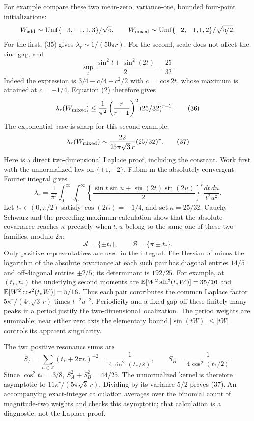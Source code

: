 For example compare these two mean-zero, variance-one, bounded four-point
initializations:
\[
 W_{\rm odd}\sim\operatorname{Unif}\{-3,-1,1,3\}/\sqrt5,
 \qquad
 W_{\rm mixed}\sim\operatorname{Unif}\{-2,-1,1,2\}/\sqrt{5/2}.
\]
For the first, (35) gives $\lambda_r\sim1/(50\pi r)$.
For the second, scale does not affect the sine gap, and
\[
 \sup_t\frac{\sin^2t+\sin^2(2t)}2=\frac{25}{32}.
\]
Indeed the expression is $3/4-c/4-c^2/2$ with $c=\cos2t$, whose
maximum is attained at $c=-1/4$. Equation (2) therefore gives
\[
 \lambda_r(W_{\rm mixed})\le\frac1{\pi^2}
       \left(\frac r{r-1}\right)^2(25/32)^{r-1}.       \tag{36}
\]
The exponential base is sharp for this second example:
\[
 \lambda_r(W_{\rm mixed})\sim
       \frac{22}{25\pi\sqrt3\,r}(25/32)^r.             \tag{37}
\]
Here is a direct two-dimensional Laplace proof, including the constant.
Work first with the unnormalized law on $\{\pm1,\pm2\}$. Fubini in
the absolutely convergent Fourier integral gives
\[
 \lambda_r=\frac1{\pi^2}\int_0^\infty\int_0^\infty
 \left\{\frac{\sin t\sin u+\sin(2t)\sin(2u)}2\right\}^{r}
                                      \frac{dt\,du}{t^2u^2}.
\]
Let $t_*\in(0,\pi/2)$ satisfy $\cos(2t_*)=-1/4$, and set
$\kappa=25/32$. Cauchy--Schwarz and the preceding maximum calculation
show that the absolute covariance reaches $\kappa$ precisely when
$t,u$ belong to the same one of these two families, modulo $2\pi$:
\[
 \mathcal A=\{\pm t_*\},\qquad
 \mathcal B=\{\pi\pm t_*\}.
\]
Only positive representatives are used in the integral. The Hessian of
minus the logarithm of the absolute covariance at each such pair has
diagonal entries $14/5$ and off-diagonal entries $\pm2/5$; its determinant
is $192/25$. For example, at $(t_*,t_*)$ the underlying second moments
are $\mathbb E[W^2\sin^2(t_*W)]=35/16$ and
$\mathbb E[W^2\cos^2(t_*W)]=5/16$.
Thus each pair contributes the common Laplace factor
$5\kappa^r/(4\pi\sqrt3\,r)$ times $t^{-2}u^{-2}$.
Periodicity and a fixed gap off these finitely many peaks in a period
justify the two-dimensional localization. The period weights are
summable; near either zero axis the elementary bound
$|\sin(tW)|\le|tW|$ controls its apparent singularity.

The two positive resonance sums are
\[
 S_A=\sum_{n\in\mathbb Z}(t_*+2\pi n)^{-2}
       =\frac1{4\sin^2(t_*/2)},\qquad
 S_B=\frac1{4\cos^2(t_*/2)}.
\]
Since $\cos^2t_*=3/8$, $S_A^2+S_B^2=44/25$.
The unnormalized kernel is therefore asymptotic to
$11\kappa^r/(5\pi\sqrt3\,r)$. Dividing by its variance $5/2$
proves (37). An accompanying exact-integer calculation averages over the
binomial count of magnitude-two weights and checks this asymptotic;
that calculation is a diagnostic, not the Laplace proof.

